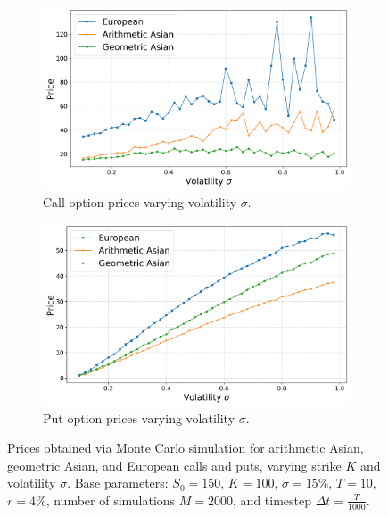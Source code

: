 \begin{figure}[h]
\begin{subfigure}[b]{0.45\linewidth}
    \centering
    \includegraphics[width=\linewidth]{graphics/arithmetic_call_prices_sigma.png}
    \caption{Call option prices varying volatility $\sigma$.}
    \label{fig:arith_call_sigma}
\end{subfigure}
\hfill
\begin{subfigure}[b]{0.45\linewidth}
    \centering
    \includegraphics[width=\linewidth]{graphics/arithmetic_put_prices_sigma.png}
    \caption{Put option prices varying volatility $\sigma$.}
    \label{fig:arith_put_sigma}
\end{subfigure}

\caption{Prices obtained via Monte Carlo simulation for arithmetic Asian, geometric Asian, and European calls and puts, varying strike $K$ and volatility $\sigma$. Base parameters: $S_0 = 150$, $K=100$, $\sigma =15\%$, $T=10$, $r=4\%$, number of simulations $M=2000$, and timestep $\Delta t = \frac{T}{1000}$.}
\label{fig:asian_arith_prices}
\end{figure}

